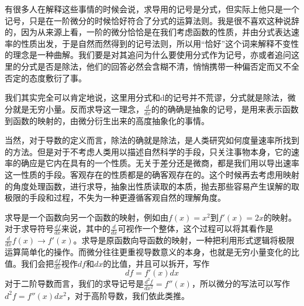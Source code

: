 \documentclass[fontset=none]{ctexart}
\begin{document}
有很多人在解释这些事情的时候会说，求导用的记号是分式，但实际上他只是一个记号，只是在一阶微分的时候恰好符合了分式的运算法则。我是很不喜欢这种说辞的，因为从来源上看，一阶的微分恰恰是在我们考虑函数的性质，并由分式表达速率的性质出发，于是自然而然得到的记号法则，所以用“恰好”这个词来解释不变性的理念是一种曲解。我们要是对其追问为什么要使用分式作为记号，亦或者追问这里的分式是否是除法，他们的回答必然会含糊不清，悄悄携带一种偏否定而又不全否定的态度敷衍了事。

我们其实完全可以肯定地说，这里用分式和d的记号并不荒谬，分式就是除法，微分就是无穷小量。反而求导这一理念，$\frac{d}{dx}$的的确确是抽象的记号，是用来表示函数到函数的映射的，由微分衍生出来的高度抽象化的事情。

当然，对于导数的定义而言，除法的确就是除法，是人类研究如何度量速率所找到的方法。但是对于不考虑人类用以描述自然科学的手段，只关注事物本身，它的速率的确应是它内在具有的一个性质。无关于差分还是微商，都是我们用以导出速率这一性质的手段。客观存在的性质都是的确客观存在的。这个时候再去考虑用映射的角度处理函数，进行求导，抽象出性质读取的本质，抛去那些容易产生误解的取极限的手段和过程，不失为一种更遵循客观自然的理解角度。


求导是一个函数向另一个函数的映射，例如由$f(x)=x^2$到$f'(x)=2x$的映射。对于求导符号$\frac{df}{dx}$来说，其中的$\frac{d}{dx}$可视作一个整体，这个过程可以将其看作是$\frac{d}{dx}f\left( x \right) \rightarrow f'\left( x \right) $。求导是原函数向导函数的映射，一种把利用形式逻辑将极限运算简单化的操作。而微分往往更重视导数意义的本身，也就是无穷小量变化的比值。我们会把$\frac{df}{dx}$视作$df$和$dx$的比值，并且可以拆开，写作$$df=f'\left( x \right) dx$$对于二阶导数而言，我们的求导记号是$\frac{d^2f}{dx^2}=f''\left( x \right) $，所以微分的写法可以写作$d^2f=f''\left( x \right) dx^2$，对于高阶导数，我们依此类推。
\end{document}

